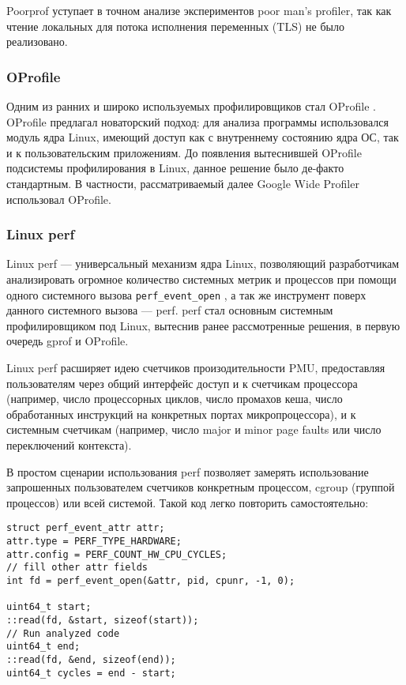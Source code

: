 Poorprof уступает в точном анализе экспериментов poor man's profiler,
так как чтение локальных для потока исполнения переменных (TLS) не было реализовано.

\subsubsection{OProfile}
Одним из ранних и широко используемых профилировщиков стал OProfile \cite{oprofile}.
OProfile предлагал новаторский подход: для анализа программы использовался модуль ядра Linux, имеющий доступ как с внутреннему состоянию
ядра ОС, так и к пользовательским приложениям. До появления вытеснившей OProfile подсистемы профилирования в Linux, данное решение было
де-факто стандартным. В частности, рассматриваемый далее Google Wide Profiler \cite{gwp} использовал OProfile.

\subsubsection{Linux perf} \label{sec:perf}
Linux perf \cite{perf} --- универсальный механизм ядра Linux, позволяющий разработчикам анализировать огромное количество системных метрик
и процессов при помощи одного системного вызова \verb!perf_event_open! \cite{perf:syscall},
а так же инструмент поверх данного системного вызова --- perf.
perf стал основным системным профилировщиком под Linux, вытеснив ранее рассмотренные решения, в первую очередь gprof и OProfile.

Linux perf расширяет идею счетчиков произодительности PMU, предоставляя пользователям через общий интерфейс доступ и к счетчикам
процессора (например, число процессорных циклов, число промахов кеша, число обработанных инструкций на конкретных портах микропроцессора),
и к системным счетчикам (например, число major и minor page faults или число переключений контекста).

В простом сценарии использования perf позволяет замерять использование запрошенных пользователем счетчиков конкретным процессом,
cgroup (группой процессов) или всей системой.
Такой код легко повторить самостоятельно:
\begin{verbatim}
struct perf_event_attr attr;
attr.type = PERF_TYPE_HARDWARE;
attr.config = PERF_COUNT_HW_CPU_CYCLES;
// fill other attr fields
int fd = perf_event_open(&attr, pid, cpunr, -1, 0);

uint64_t start;
::read(fd, &start, sizeof(start));
// Run analyzed code
uint64_t end;
::read(fd, &end, sizeof(end));
uint64_t cycles = end - start;
\end{verbatim}

